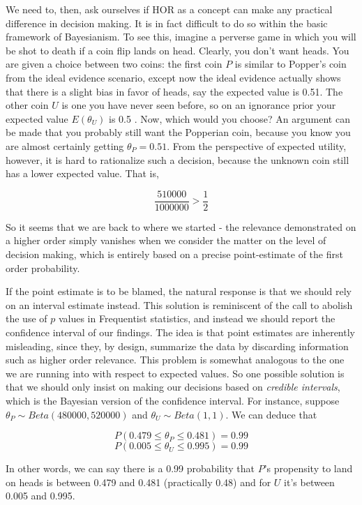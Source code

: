 We need to, then, ask ourselves if HOR as a concept can make any
practical difference in decision making. It is in fact difficult to do
so within the basic framework of Bayesianism. To see this, imagine a
perverse game in which you will be shot to death if a coin flip lands on
head. Clearly, you don't want heads. You are given a choice between two
coins: the first coin \(P\) is similar to Popper's coin from the ideal
evidence scenario, except now the ideal evidence actually shows that
there is a slight bias in favor of heads, say the expected value is
0.51. The other coin \(U\) is one you have never seen before, so on an
ignorance prior your expected value \(E(\theta_U)\) is 0.5 . Now, which
would you choose? An argument can be made that you probably still want
the Popperian coin, because you know you are almost certainly getting
\(\theta_P = 0.51\). From the perspective of expected utility, however,
it is hard to rationalize such a decision, because the unknown coin
still has a lower expected value. That is,

\[\frac{510000}{1000000}> \frac{1}{2}\]

So it seems that we are back to where we started - the relevance
demonstrated on a higher order simply vanishes when we consider the
matter on the level of decision making, which is entirely based on a
precise point-estimate of the first order probability.

If the point estimate is to be blamed, the natural response is that we
should rely on an interval estimate instead. This solution is reminiscent of
the call to abolish the use of \(p\) values in Frequentist statistics,
and instead we should report the confidence interval of our findings.
The idea is that point estimates are inherently misleading, since they,
by design, summarize the data by discarding information such as higher
order relevance. This problem is somewhat analogous to the one we are
running into with respect to expected values. So one possible solution
is that we should only insist on making our decisions based on
\emph{credible intervals}, which is the Bayesian version of the
confidence interval. For instance, suppose
\(\theta_P \sim Beta(480000,520000)\) and \(\theta_U \sim Beta(1,1)\).
We can deduce that

\[P(0.479\leq \theta_P \leq 0.481) = 0.99\]
\[P(0.005\leq \theta_U \leq 0.995) = 0.99\]

\noindent In other words, we can say there is a 0.99 probability that
\(P\)'s propensity to land on heads is between 0.479 and 0.481
(practically 0.48) and for \(U\) it's between 0.005 and 0.995.

